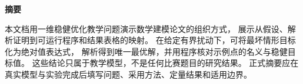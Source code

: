 \begin{center}{\bfseries 摘\quad 要}\end{center}
本文档用一维稳健优化教学问题演示数学建模论文的组织方式，
展示从假设、解析证明到可运行程序和结果表格的映射。
在给定有界扰动下，可将最坏情形目标化为绝对值表达式，
解析得到唯一最优解，并用程序核对示例点的名义与稳健目标值。
这些结论只属于教学模型，不是任何比赛题目的研究结果。
正式摘要应在真实模型与实验完成后填写问题、采用方法、定量结果和适用边界。
\par\vspace{1.5em}
\paperkeywords
